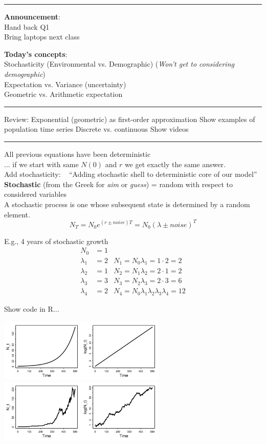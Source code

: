 \documentclass{article}
\newcommand{\note}[1]{\colorbox{gray!20}{#1}}
\begin{document}
\noindent{}

\rule[0.5ex]{\linewidth}{1pt}
\textbf{Announcement}: \\
Hand back Q1\\
Bring laptops next class

\textbf{Today's concepts}: \\
Stochasticity (Environmental vs. Demographic) (\textit{Won't get to considering demographic})\\
Expectation vs. Variance (uncertainty)\\
Geometric vs. Arithmetic expectation

\rule[0.5ex]{\linewidth}{1pt}
Review:
Exponential (geometric) as first-order approximation \note{Show examples of population time series}
Discrete vs. continuous \note{Show videos}

\rule[0.5ex]{\linewidth}{1pt}
All previous equations have been deterministic\\
... if we start with same $N(0)$ and $r$ we get exactly the same answer.\\
Add stochasticity:   ``Adding stochastic shell to deterministic core of our model''\\

\textbf{Stochastic} (from the Greek for \emph{aim} or \emph{guess}) = random with respect to considered variables\\
A stochastic process is one whose subsequent state is determined by a random element.
\begin{equation*}
	N_T = N_0 e^{(r\pm noise)T} = N_0 (\lambda \pm noise)^T
\end{equation*}

E.g., 4 years of stochastic growth
\begin{align*}
	N_0 &= 1 &\\
	\lambda_1 &= 2 & N_1 = N_0 \lambda_1 = 1\cdot 2 =  2\\
	\lambda_2 &= 1 & N_2 = N_1 \lambda_2 = 2\cdot 1 =  2\\
	\lambda_3 &= 3 & N_3 = N_2 \lambda_3 = 2\cdot 3 =  6\\
	\lambda_4 &= 2 & N_4 = N_0 \lambda_1 \lambda_2 \lambda_3 \lambda_4 =  12
\end{align*}

\note{Show code in R...}
\begin{center}
\includegraphics[width=8cm]{figs/image}\\
\includegraphics[width=8cm]{figs/image0}
\end{center}
\end{document}
